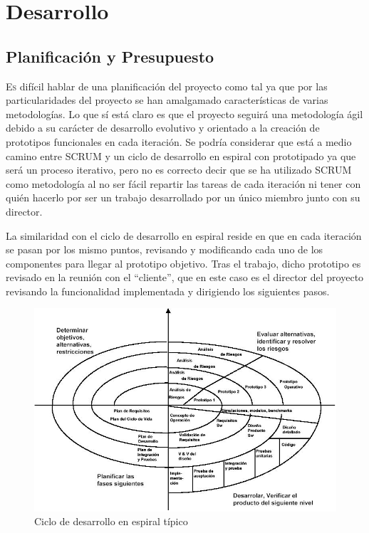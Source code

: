 \chapter{Desarrollo}
\label{chap:desarrollo}
\vspace{0.5cm}


\section{Planificación y Presupuesto}
\label{sec:planning}
\lettrine{E}{s} difícil hablar de una planificación del proyecto como tal ya que por las particularidades del proyecto se han amalgamado características de varias metodologías. Lo que sí está claro es que el proyecto seguirá una metodología ágil debido a su carácter de desarrollo evolutivo y orientado a la creación de prototipos funcionales en cada iteración. Se podría considerar que está a medio camino entre SCRUM y un ciclo de desarrollo en espiral con prototipado ya que será un proceso iterativo, pero no es correcto decir que se ha utilizado SCRUM como metodología al no ser fácil repartir las tareas de cada iteración ni tener con quién hacerlo por ser un trabajo desarrollado por un único miembro junto con su director. 

La similaridad con el ciclo de desarrollo en espiral reside en que en cada iteración se pasan por los mismo puntos, revisando y modificando cada uno de los componentes para llegar al prototipo objetivo. Tras el trabajo, dicho prototipo es revisado en la reunión con el ``cliente'', que en este caso es el director del proyecto revisando la funcionalidad implementada y dirigiendo los siguientes pasos.

\begin{figure}
	\centering
	\includegraphics[width=0.8\linewidth]{imagenes/espiral.jpg}
	\caption{Ciclo de desarrollo en espiral típico}
	\label{fig:ciclo_espiral}
\end{figure}

